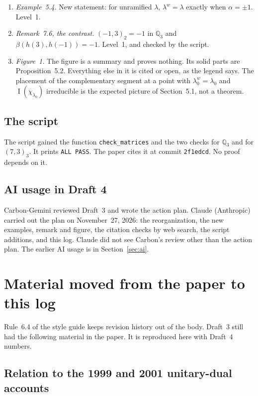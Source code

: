 \documentclass[12pt,letterpaper]{article}
\newcommand{\ZA}{Z_A}
\newcommand{\Qq}{\mathbb Q}
\newcommand{\SL}{\mathrm{SL}}
\DeclareMathOperator{\PI}{I}
\begin{document}
\begin{enumerate}[leftmargin=*]
  for the threefold cover of $\SL(2,\Qq_7)$. Level~1 for the count,
  given the cited criterion. For odd $n$ the character $\lambda$ is
  determined by $\eta_\lambda$, because $\ZA=\mu_n\times\ZA^0$ and
  $\nu$ maps $A$ onto $\ZA^0$.
\item \emph{Example~5.4.} New statement: for unramified
  $\lambda$, $\lambda^w=\lambda$ exactly when $\alpha=\pm1$. Level~1.
\item \emph{Remark~7.6, the contrast.} $(-1,3)_2=-1$ in $\Qq_3$ and
  $\beta(h(3),h(-1))=-1$. Level~1, and checked by the script.
\item \emph{Figure~1.} The figure is a summary and proves nothing.
  Its solid parts are Proposition~5.2. Everything else in it is
  cited or open, as the legend says. The placement of the
  complementary segment at a point with $\lambda_0^w=\lambda_0$ and
  $\PI(\chi_{\lambda_0})$ irreducible is the expected picture of
  Section~5.1, not a theorem.
\end{enumerate}

\subsection{The script}
The script  gained the function
\texttt{check\_matrices} and the two checks for $\Qq_3$ and for
$(7,3)_3$. It prints \texttt{ALL PASS}. The paper cites it at commit
\texttt{2f1edcd}. No proof depends on it.

\subsection{AI usage in Draft 4}
Carbon-Gemini reviewed Draft~3 and wrote the action plan. Claude
(Anthropic) carried out the plan on November~27, 2026: the
reorganization, the new examples, remark and figure, the citation
checks by web search, the script additions, and this log. Claude did
not see Carbon's review other than the action plan. The earlier AI
usage is in Section~\ref{sec:ai}.

\section{Material moved from the paper to this log}\label{sec:moved}

Rule~6.4 of the style guide keeps revision history out of the body.
Draft~3 still had the following material in the paper. It is reproduced
here with Draft~4 numbers.

\subsection{Relation to the 1999 and 2001 unitary-dual accounts}
\end{document}

